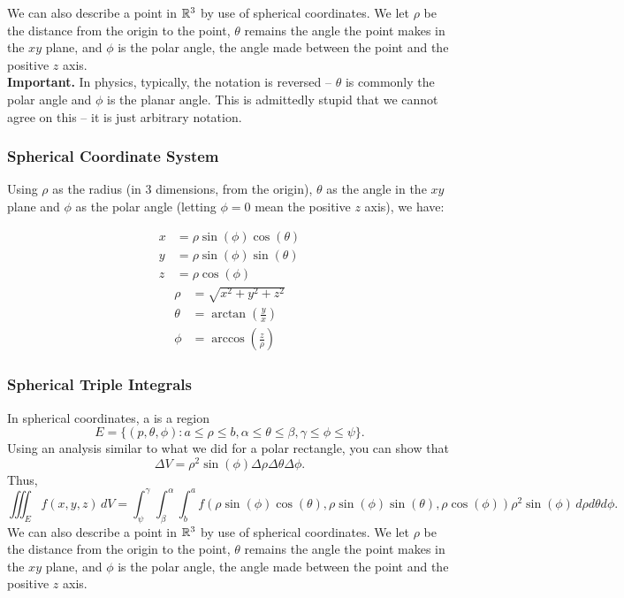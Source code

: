 We can also describe a point in \(\mathbb{R}^3\) by use of spherical coordinates. We let \(\rho\) be the distance from the origin to the point, \(\theta\) remains the angle the point makes in the \(xy\) plane, and \(\phi\) is the polar angle, the angle made between the point and the positive \(z\) axis. \\

\textbf{Important.} In physics, typically, the notation is reversed – \(\theta\) is commonly the polar angle and \(\phi\) is the planar angle. This is admittedly stupid that we cannot agree on this – it is just arbitrary notation.

\subsubsection{Spherical Coordinate System}

Using \(\rho\) as the radius (in 3 dimensions, from the origin), \(\theta\) as the angle in the \(xy\) plane and \(\phi\) as the polar angle (letting \(\phi = 0\) mean the positive \(z\) axis), we have:

\begin{multicols}{2}
  \noindent
  \begin{align*}
    x & = \rho \sin(\phi) \cos(\theta) \\
    y & = \rho \sin(\phi) \sin(\theta) \\
    z & = \rho \cos(\phi)
  \end{align*}
  \begin{align*}
    \rho & = \sqrt{x^2 + y^2 + z^2} \\
    \theta & = \arctan(\tfrac{y}{x}) \\
    \phi & = \arccos(\tfrac{z}{\rho})
  \end{align*}
\end{multicols}

\subsubsection{Spherical Triple Integrals}

In spherical coordinates, a  is a region
\[
  E = \{(p, \theta, \phi) : a \leq \rho \leq b, \alpha \leq \theta \leq \beta, \gamma \leq \phi \leq \psi\}.
\]
Using an analysis similar to what we did for a polar rectangle, you can show that
\[
  \Delta V = \rho^2 \sin(\phi) \Delta \rho \Delta \theta \Delta \phi.
\]
Thus,
\[
  \iiint_E f(x, y, z) \, dV = \int_{\psi}^{\gamma} \int_{\beta}^{\alpha} \int_{b}^{a} f(\rho \sin(\phi) \cos(\theta), \rho \sin(\phi) \sin(\theta), \rho \cos(\phi)) \rho^2 \sin(\phi) \, d\rho d\theta d\phi.
\]
We can also describe a point in \(\mathbb{R}^3\) by use of spherical coordinates. We let \(\rho\) be the distance from the origin to the point, \(\theta\) remains the angle the point makes in the \(xy\) plane, and \(\phi\) is the polar angle, the angle made between the point and the positive \(z\) axis.

